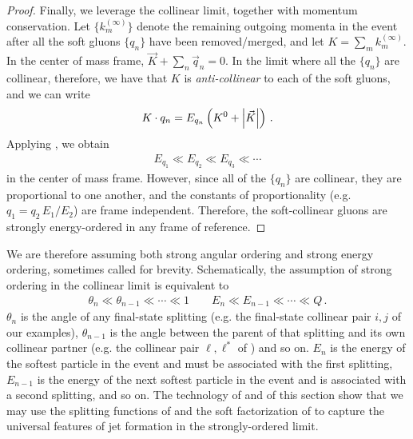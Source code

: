 \begin{proof}
     Finally, we leverage the collinear limit, together with momentum conservation.
     Let \(\{k^{(\infty)}_m\}\) denote the remaining outgoing momenta in the event after all the soft gluons \(\{q_n\}\) have been removed/merged, and let \(K = \sum_m k^{(\infty)}_m\).
     In the center of mass frame, \(\vec{K} + \sum_n \vec{q}_n = 0\).
     In the limit where all the \(\{q_n\}\) are collinear, therefore, we have that \(K\) is \textit{anti-collinear} to each of the soft gluons, and we can write
     \begin{align}
         K \cdot q_n = E_{q_n} \left(K^0 + \abs{\vec{K}}\right)
         \,.
     \end{align}
     Applying , we obtain
     \begin{align}
         E_{q_1} \ll E_{q_2} \ll E_{q_3} \ll \cdots
     \end{align}
     in the center of mass frame.
     However, since all of the \(\{q_n\}\) are collinear, they are proportional to one another, and the constants of proportionality (e.g. \(q_1 = q_2 \, E_1/E_2\)) are frame independent.
     Therefore, the soft-collinear gluons are strongly energy-ordered in any frame of reference.
\end{proof}



We are therefore assuming both strong angular ordering and strong energy ordering, sometimes called  for brevity.
%
Schematically, the assumption of strong ordering in the collinear limit is equivalent to
\begin{align}
    \label{eq:strong-ordering}
    \theta_n \ll \theta_{n-1} \ll \cdots \ll 1
    \qquad
    E_n \ll E_{n-1} \ll \cdots \ll Q
    \,.
\end{align}
\(\theta_n\) is the angle of any final-state splitting (e.g. the final-state collinear pair \(i,j\) of our examples), \(\theta_{n-1}\) is the angle between the parent of that splitting and its own collinear partner (e.g. the collinear pair \(\ell, \ell^*\) of ) and so on.
%
\(E_n\) is the energy of the softest particle in the event and must be associated with the first splitting, \(E_{n-1}\) is the energy of the next softest particle in the event and is associated with a second splitting, and so on.
%
The technology of  and of this section show that we may use the splitting functions of  and the soft factorization of  to capture the universal features of jet formation in the strongly-ordered limit.

